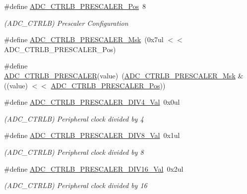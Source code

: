 \begin{DoxyCompactItemize}
\item 
\#define \mbox{\hyperlink{group___s_a_m_d21___a_d_c_ga67bbef18402c0d73dcc1698fa185ab76}{A\+D\+C\+\_\+\+C\+T\+R\+L\+B\+\_\+\+P\+R\+E\+S\+C\+A\+L\+E\+R\+\_\+\+Pos}}~8
\begin{DoxyCompactList}\small\item\em (A\+D\+C\+\_\+\+C\+T\+R\+LB) Prescaler Configuration \end{DoxyCompactList}\item 
\#define \mbox{\hyperlink{group___s_a_m_d21___a_d_c_ga4b9e8131975ab900605823a3b0341258}{A\+D\+C\+\_\+\+C\+T\+R\+L\+B\+\_\+\+P\+R\+E\+S\+C\+A\+L\+E\+R\+\_\+\+Msk}}~(0x7ul $<$$<$ A\+D\+C\+\_\+\+C\+T\+R\+L\+B\+\_\+\+P\+R\+E\+S\+C\+A\+L\+E\+R\+\_\+\+Pos)
\item 
\#define \mbox{\hyperlink{group___s_a_m_d21___a_d_c_ga9717ff4851d2f7e81e81789397dc5e14}{A\+D\+C\+\_\+\+C\+T\+R\+L\+B\+\_\+\+P\+R\+E\+S\+C\+A\+L\+ER}}(value)~(\mbox{\hyperlink{group___s_a_m_d21___a_d_c_ga4b9e8131975ab900605823a3b0341258}{A\+D\+C\+\_\+\+C\+T\+R\+L\+B\+\_\+\+P\+R\+E\+S\+C\+A\+L\+E\+R\+\_\+\+Msk}} \& ((value) $<$$<$ \mbox{\hyperlink{group___s_a_m_d21___a_d_c_ga67bbef18402c0d73dcc1698fa185ab76}{A\+D\+C\+\_\+\+C\+T\+R\+L\+B\+\_\+\+P\+R\+E\+S\+C\+A\+L\+E\+R\+\_\+\+Pos}}))
\item 
\#define \mbox{\hyperlink{group___s_a_m_d21___a_d_c_gaba2eeed7d542b9de1eb9a50e78acd772}{A\+D\+C\+\_\+\+C\+T\+R\+L\+B\+\_\+\+P\+R\+E\+S\+C\+A\+L\+E\+R\+\_\+\+D\+I\+V4\+\_\+\+Val}}~0x0ul
\begin{DoxyCompactList}\small\item\em (A\+D\+C\+\_\+\+C\+T\+R\+LB) Peripheral clock divided by 4 \end{DoxyCompactList}\item 
\#define \mbox{\hyperlink{group___s_a_m_d21___a_d_c_ga5c595885e48c5b30373553f9bc85c5e2}{A\+D\+C\+\_\+\+C\+T\+R\+L\+B\+\_\+\+P\+R\+E\+S\+C\+A\+L\+E\+R\+\_\+\+D\+I\+V8\+\_\+\+Val}}~0x1ul
\begin{DoxyCompactList}\small\item\em (A\+D\+C\+\_\+\+C\+T\+R\+LB) Peripheral clock divided by 8 \end{DoxyCompactList}\item 
\#define \mbox{\hyperlink{group___s_a_m_d21___a_d_c_gae9c4228a9a26ca419668edabde055ca4}{A\+D\+C\+\_\+\+C\+T\+R\+L\+B\+\_\+\+P\+R\+E\+S\+C\+A\+L\+E\+R\+\_\+\+D\+I\+V16\+\_\+\+Val}}~0x2ul
\begin{DoxyCompactList}\small\item\em (A\+D\+C\+\_\+\+C\+T\+R\+LB) Peripheral clock divided by 16 \end{DoxyCompactList}\item 

\end{DoxyCompactItemize}
